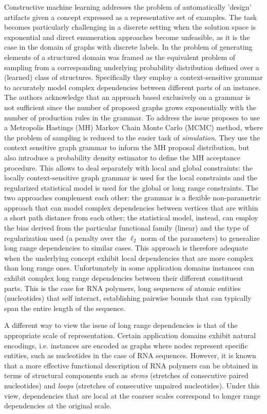\documentclass{article}
\begin{document}
Constructive machine learning addresses the problem of automatically 'design'
artifacts given a concept expressed as a representative set of examples. The
task becomes particularly challenging in a discrete setting when the solution
space is exponential and direct enumeration approaches become unfeasible, as
it is the case in the domain of graphs with discrete labels. In \cite{costa16}
the problem of generating elements of a structured domain was framed as the
equivalent problem of sampling from a corresponding underlying probability
distribution defined over a (learned) class of structures. Specifically they
employ a context-sensitive grammar to accurately model complex dependencies
between different parts of an instance. The authors acknowledge that an
approach based exclusively on a grammar is not sufficient since the number of
proposed graphs grows exponentially with the number of production rules in the
grammar. To address the issue \cite{costa16} proposes to use a Metropolis
Hastings (MH) Markov Chain Monte Carlo (MCMC) method, where the problem of
sampling is reduced to the easier task of {\em simulation}. They use the
context sensitive graph grammar to inform the MH proposal distribution, but
also introduce a probability density estimator to define the MH acceptance
procedure. This allows to deal separately with local and global constraints:
the locally context-sensitive graph grammar is used for the local constraints
and the regularized statistical model is used for the global or long range
constraints. The two approaches complement each other: the grammar is a
flexible non-parametric approach that can model complex dependencies between
vertices that are within a short path distance from each other; the
statistical model, instead, can employ the bias derived from the particular
functional family (linear) and the type of regularization used (a penalty over
the $\ell_2$ norm of the parameters) to generalize long range dependencies to
similar cases. This approach is therefore adequate when the underlying concept
exhibit local dependencies that are more complex than long range ones.
Unfortunately in some application domains instances can exhibit complex long
range dependencies between their different constituent parts. This is the case
for RNA polymers, long sequences of atomic entities (nucleotides) that self
interact, establishing pairwise bounds that can typically span the entire
length of the sequence.

A different way to view the issue of long range dependencies is that of the
appropriate scale of representation. Certain application domains exhibit
natural encodings, i.e. instances are encoded as graphs where nodes represent
specific entities, such as nucleotides in the case of RNA sequences. However,
it is known that a more effective functional description of RNA polymers can
be obtained in terms of structural components such as {\em stems} (stretches
of consecutive paired nucleotides) and {\em loops} (stretches of consecutive
unpaired nucleotides). Under this view, dependencies that are local at the
coarser scales correspond to longer range dependencies at the original scale.
\end{document}
